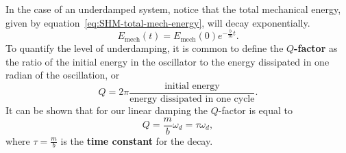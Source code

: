\documentclass[../classical_mechanics.tex]{subfiles}
\begin{document}
        In the case of an underdamped system, notice that the total mechanical energy, given by equation~\ref{eq:SHM-total-mech-energy}, will decay exponentially.
        \begin{equation}
            E_\text{mech}(t)=E_\text{mech}(0)e^{-\frac{b}{m}t}.
        \end{equation}
        To quantify the level of underdamping, it is common to define the \textbf{$Q$-factor} as the ratio of the initial energy in the oscillator to the energy dissipated in one radian of the oscillation, or
        \begin{equation}
            Q=2\pi\frac{\text{initial energy}}{\text{energy dissipated in one cycle}}.
        \end{equation}
        It can be shown that for our linear damping the $Q$-factor is equal to
        \begin{equation}
            Q=\frac{m}{b}\omega_d=\tau\omega_d,
        \end{equation}
        where $\tau=\frac{m}{b}$ is the \textbf{time constant} for the decay.

\end{document}
